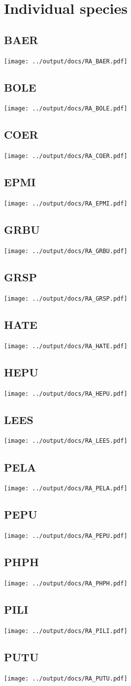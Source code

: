 \documentclass[10pt]{book} %
\begin{document}
\section{Individual species}
\subsection{BAER}
\texttt{[image: ../output/docs/RA\_BAER.pdf]}
\subsection{BOLE}
\texttt{[image: ../output/docs/RA\_BOLE.pdf]}
\subsection{COER}
\texttt{[image: ../output/docs/RA\_COER.pdf]}
\subsection{EPMI}
\texttt{[image: ../output/docs/RA\_EPMI.pdf]}
\subsection{GRBU}
\texttt{[image: ../output/docs/RA\_GRBU.pdf]}
\subsection{GRSP}
\texttt{[image: ../output/docs/RA\_GRSP.pdf]}
\subsection{HATE}
\texttt{[image: ../output/docs/RA\_HATE.pdf]}
\subsection{HEPU}
\texttt{[image: ../output/docs/RA\_HEPU.pdf]}
\subsection{LEES}
\texttt{[image: ../output/docs/RA\_LEES.pdf]}
\subsection{PELA}
\texttt{[image: ../output/docs/RA\_PELA.pdf]}
\subsection{PEPU}
\texttt{[image: ../output/docs/RA\_PEPU.pdf]}
\subsection{PHPH}
\texttt{[image: ../output/docs/RA\_PHPH.pdf]}
\subsection{PILI}
\texttt{[image: ../output/docs/RA\_PILI.pdf]}
\subsection{PUTU}
\texttt{[image: ../output/docs/RA\_PUTU.pdf]}
\end{document}
